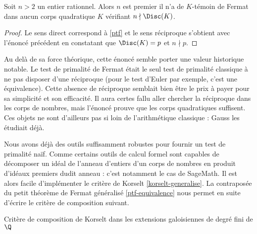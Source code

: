\begin{theoreme}\label{ptf-equivalence}
	Soit $n>2$ un entier rationnel. Alors $n$ est premier \ssi il n'a de $K$-témoin de Fermat dans aucun corps quadratique $K$ vérifiant $n\nmid \Disc(K)$.
\end{theoreme}

\begin{proof}
	Le sens direct correspond à \ref{ptf} et le sens réciproque s'obtient avec l'énoncé précédent en constatant que $\Disc(K) = p$ et $n\nmid p$.
\end{proof}

\begin{remarque}
Au delà de sa force théorique, cette énoncé semble porter une valeur historique notable. Le test de primalité de Fermat était le seul test de primalité classique à ne pas disposer d'une réciproque (pour le test d'Euler par exemple, c'est une équivalence). Cette absence de réciproque semblait bien être le prix à payer pour sa simplicité et son efficacité. Il aura certes fallu aller chercher la réciproque dans les corps de nombres, mais l'énoncé prouve que les corps quadratiques suffisent. Ces objets ne sont d'ailleurs pas si loin de l'arithmétique classique : Gauss les étudiait déjà.
\end{remarque}

Nous avons déjà des outils suffisamment robustes pour fournir un test de primalité naïf. Comme certains outils de calcul formel sont capables de décomposer un idéal de l'anneau d'entiers d'un corps de nombres en produit d'idéaux premiers dudit anneau : c'est notamment le cas de SageMath. Il est alors facile d'implémenter le critère de Korselt \ref{korselt-generalise}. La contraposée du petit théorème de Fermat généralisé \ref{ptf-equivalence} nous permet en suite d'écrire le critère de composition suivant.

\vspace{1em}
\begin{algorithm}[H]\label{test-primalite-korselt}
\caption{Critère de composition de Korselt dans les extensions galoisiennes de degré fini de $\Q$}
\end{algorithm}
\vspace{1em}

